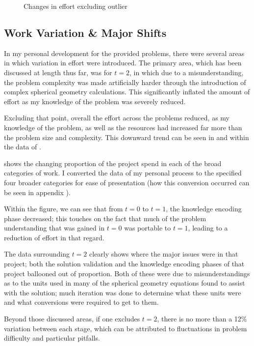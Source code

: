 \documentclass[a4paper,10pt]{article}
\begin{document}
\begin{figure}
\centering

\caption{Changes in effort excluding outlier}
\label{fig:effort2}
\end{figure}

\subsection{Work Variation \& Major Shifts}
In my personal development for the provided problems, there were several areas in which variation in effort were introduced. The primary area, which has been discussed at length thus far, was for $t=2$, in which due to a misunderstanding, the problem complexity was made artificially harder through the introduction of complex spherical geometry calculations. This significantly inflated the amount of effort as my knowledge of the problem was severely reduced.

Excluding that point, overall the effort across the problems reduced, as my knowledge of the problem, as well as the resources had increased far more than the problem size and complexity. This downward trend can be seen in  and within the data of .

 shows the changing proportion of the project spend in each of the broad categories of work. I converted the data of my personal process to the specified four broader categories for ease of presentation (how this conversion occurred can be seen in appendix ).

Within the figure, we can see that from $t=0$ to $t=1$, the knowledge encoding phase decreased; this touches on the fact that much of the problem understanding that was gained in $t=0$ was portable to $t=1$, leading to a reduction of effort in that regard. 

The data surrounding $t=2$ clearly shows where the major issues were in that project; both the solution validation and the knowledge encoding phases of that project ballooned out of proportion. Both of these were due to misunderstandings as to the units used in many of the spherical geometry equations found to assist with the solution; much iteration was done to determine what these units were and what conversions were required to get to them.

Beyond those discussed areas, if one excludes $t=2$, there is no more than a 12\% variation between each stage, which can be attributed to fluctuations in problem difficulty and particular pitfalls.
\end{document}
